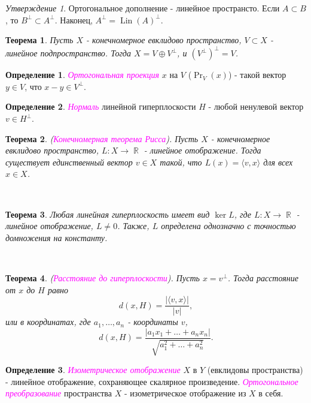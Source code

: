 \documentclass[a4paper,100pt]{article}
\theoremstyle{indented}
\newtheorem{theorem}{Теорема}
\theoremstyle{definition}
\newtheorem{defn}{Определение}
\theoremstyle{remark}
\newtheorem{stat}{Утверждение}
\DeclareMathOperator{\ra}{\rightarrow}
\DeclareMathOperator{\RR}{\mathbb{R}}
\DeclareMathOperator{\Lin}{Lin}
\DeclareMathOperator{\Prf}{Pr}
\begin{document}
\begin{stat}
    Ортогональное дополнение - линейное пространсто. Если $A\subset B$, то $B^{\perp} \subset A^{\perp}$. Наконец, $A^{\perp} = \Lin(A)^{\perp}$. 
\end{stat}

\begin{theorem}
    Пусть $X$ - конечномерное евклидово пространство, $V\subset X$ - линейное подпространство. Тогда $X= V \oplus V^{\perp}$, и $(V^{\perp})^{\perp}=V$.
\end{theorem}

\begin{defn}
    \textit{\textcolor{magenta}{\hypertarget{s68}{Ортогональная проекция}}} $x$ на $V$ ($\Prf_V(x)$) - такой вектор $y\in V$, что $x-y\in V^{\perp}$. 
\end{defn}

\begin{defn}
    \textit{\textcolor{magenta}{\hypertarget{s69}{Нормаль}}} линейной гиперплоскости $H$ - любой ненулевой вектор $v\in H^{\perp}$. 
\end{defn}

\begin{theorem}
    (\textit{\textcolor{magenta}{\hypertarget{s70}{Конечномерная теорема Рисса}}}). Пусть $X$ - конечномерное евклидово пространство, $L:X\ra \RR$ - линейное отображение. Тогда существует единственный вектор $v\in X$ такой, что $L(x)=\langle v, x \rangle$ для всех $x\in X$. 
\end{theorem} \

\begin{theorem}
    Любая линейная гиперплоскость имеет вид $\ker L$, где $L:X\ra \RR$ - линейное отображение, $L\neq 0$. Также, $L$ определена однозначно с точностью домножения на константу.
\end{theorem} \ 

\begin{theorem}
    (\textit{\textcolor{magenta}{\hypertarget{s71}{Расстояние до гиперплоскости}}}). Пусть $x=v^{\perp}$. Тогда расстояние от $x$ до $H$ равно 
    \[
        d(x, H)=\frac{|\langle v, x \rangle|}{|v|}, 
    \]
    или в координатах, где $a_1, \ldots, a_n$ - координаты $v$, 
    \[
        d(x, H)=\frac{|a_1x_1+\ldots+a_n x_n|}{\sqrt{a_1^2+\ldots+a_n^2}}.
    \]
\end{theorem}

\begin{defn}
    \textit{\textcolor{magenta}{\hypertarget{s72}{Изометрическое отображение}}} $X$ в $Y$ (евклидовы пространства) - линейное отображение, сохраняющее скалярное произведение. \textit{\textcolor{magenta}{\hypertarget{s73}{Ортогональное преобразование}}} пространства $X$ - изометрическое отображение из $X$ в себя.
\end{defn}
\end{document}
